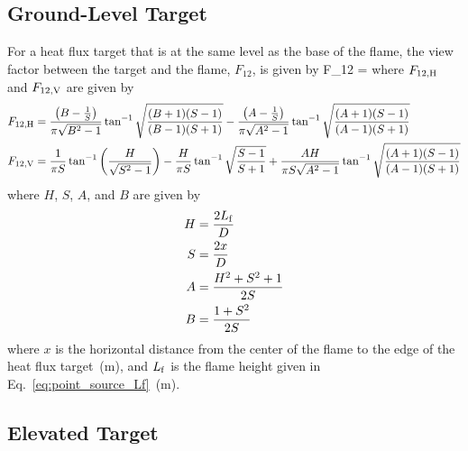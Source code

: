 \subsection*{Ground-Level Target}

\noindent For a heat flux target that is at the same level as the base of the flame, the view factor between the target and the flame, $F_{12}$, is given by
\be
F_{12} = 
\label{eq:solid_flame_F12_HV}
\ee
where $F\sb{12, H}$ and $F\sb{12, V}$ are given by
\begin{align}
F\sb{12, H} &= \frac{\left( B - \frac{1}{S} \right)}{\pi \sqrt{B^2 - 1}} \tan^{-1} \sqrt{ \frac{(B+1)(S-1)}{(B-1)(S+1)} } -
\frac{\left( A - \frac{1}{S} \right)}{\pi \sqrt{A^2 - 1}} \tan^{-1} \sqrt{ \frac{(A+1)(S-1)}{(A-1)(S+1)} } \\
F\sb{12, V} &= \frac{1}{\pi S} \tan^{-1} \left( \frac{H}{\sqrt{S^2-1}} \right) - \frac{H}{\pi S} \tan^{-1} \sqrt{\frac{S-1}{S+1}} +
\frac{A H}{\pi S \sqrt{A^2-1}} \tan^{-1} \sqrt{\frac{(A+1)(S-1)}{(A-1)(S+1)}}
\label{eq:solid_flame_F12_H_V}
\end{align}
where $H$, $S$, $A$, and $B$ are given by
\begin{align}
H &= \frac{2 L\sb{f}}{D}        \\
S &= \frac{2 x}{D}              \\
A &= \frac{H^2 + S^2 + 1}{2 S}  \\
B &= \frac{1+S^2}{2 S}
\label{eq:solid_flame_H_S_A_B}
\end{align}
where $x$ is the horizontal distance from the center of the flame to the edge of the heat
flux target~(\si{m}), and $L\sb{f}$ is the flame height given in Eq.~\ref{eq:point_source_Lf}~(\si{m}).


\clearpage


\subsection*{Elevated Target}

